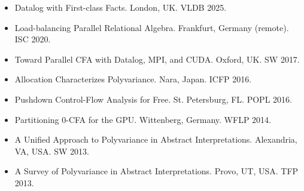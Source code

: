 \begin{itemize}
\itemsep=0.1cm
\item Datalog with First-class Facts. London, UK. VLDB 2025.
\item Load-balancing Parallel Relational Algebra. Frankfurt, Germany (remote). ISC 2020.
\item Toward Parallel CFA with Datalog, MPI, and CUDA. Oxford, UK. SW 2017.
\item Allocation Characterizes Polyvariance. Nara, Japan. ICFP 2016.
\item Pushdown Control-Flow Analysis for Free. St. Petersburg, FL. POPL 2016.
\item Partitioning 0-CFA for the GPU. Wittenberg, Germany. WFLP 2014.
\item A Unified Approach to Polyvariance in Abstract Interpretations. Alexandria, VA, USA. SW 2013.
\item A Survey of Polyvariance in Abstract Interpretations. Provo, UT, USA. TFP 2013.
\end{itemize}
